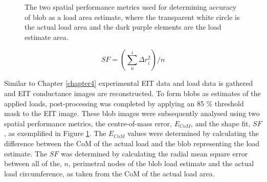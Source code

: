 \begin{figure}[H]
	\centering
	\hspace{1cm}
	\vspace{0.2cm}
	\caption{The two spatial performance metrics used for determining accuracy of blob as a load area estimate, where the transparent white circle is the actual load area and the dark purple elements are the load estimate area.}
	\label{fig:eg_spatial_metrics}
\end{figure}
\begin{equation}
	S\!F = \left( \sum^i_n \Delta r_i^2 \right) / n
	\label{eqn:sf}
\end{equation}

Similar to Chapter \ref{chapter4} experimental EIT data and load data is gathered and EIT conductance images are reconstructed. To form blobs as estimates of the applied loads, post-processing was completed by applying an 85 \% threshold mask to the EIT image. These blob images were subsequently analysed using two spatial performance metrics, the centre-of-mass error, $E_{CoM}$, and the shape fit, $S\!F$, as exemplified in Figure \ref{fig:eg_spatial_metrics}. The $E_{CoM}$ values were determined by calculating the difference between the CoM of the actual load and the blob representing the load estimate. The $S\!F$ was determined by calculating the radial mean square error between all of the, $n$, perimetral nodes of the blob load estimate and the actual load circumference, as taken from the CoM of the actual load area.


